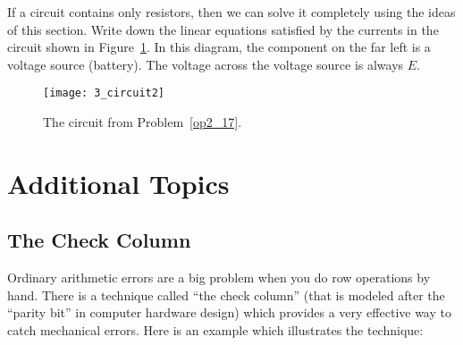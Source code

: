 \begin{problem}
\label{op2_17}
If a circuit contains only resistors, then we can solve it completely 
using the ideas
of this section. 
Write down the linear equations satisfied by the currents in the
circuit shown in Figure~\ref{fig_circuit2}. 
In this diagram, the component on the far left is a voltage
source (battery). The voltage across the voltage source is always $E$.
\end{problem}

\begin{figure}
\centerline{\texttt{[image: 3\_circuit2]}}
\caption{The circuit from Problem~\ref{op2_17}.
\label{fig_circuit2}}
\end{figure}

\section{Additional Topics}

\subsection{The Check Column}
\label{s:check} 

Ordinary arithmetic errors are a big problem when you do row operations
by hand. There is a technique called ``the check column'' (that is modeled
after the ``parity bit'' in computer hardware design) which provides a
very effective way to catch mechanical errors. Here is an example which
illustrates the technique:

